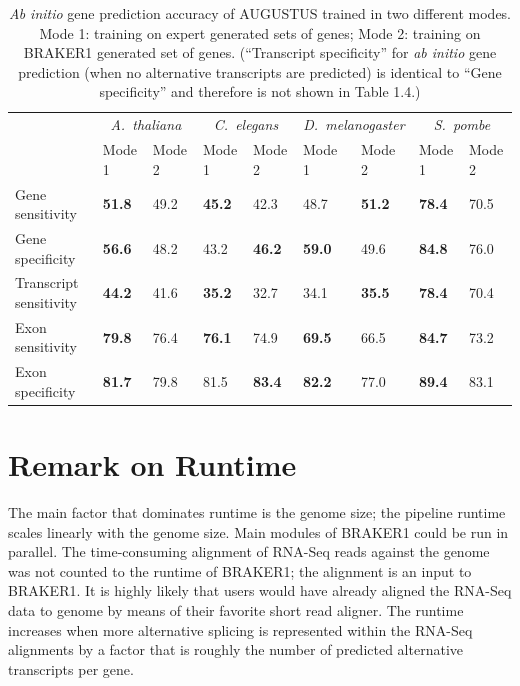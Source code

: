 \documentclass[a4paper,10pt]{report}
\begin{document}
\begin{table}[h!]
\begin{center}
\begin{tabular}{lp{1.5cm}p{1.2cm}p{1.2cm}p{1.2cm}p{1.2cm}p{1.2cm}p{1.2cm}p{1.2cm}}\hline
 & \multicolumn{2}{c}{\textit{A.~thaliana}} &  \multicolumn{2}{c}{\textit{C.~elegans}} &  \multicolumn{2}{c}{\textit{D.~melanogaster}} &  \multicolumn{2}{c}{\textit{S.~pombe}}\\
 & \tiny{Mode 1} & \tiny{Mode 2} & \tiny{Mode 1} & \tiny{Mode 2} &  \tiny{Mode 1} & \tiny{Mode 2} & \tiny{Mode 1} &\tiny{Mode 2}\\
 \hline
Gene sensitivity        & \textbf{51.8} & 49.2 & \textbf{45.2} & 42.3 & 48.7 & \textbf{51.2} & \textbf{78.4} & 70.5 \\
Gene specificity        & \textbf{56.6} & 48.2 & 43.2 & \textbf{46.2} & \textbf{59.0} & 49.6 & \textbf{84.8} & 76.0  \\
Transcript sensitivity  & \textbf{44.2} & 41.6 & \textbf{35.2} & 32.7 & 34.1 & \textbf{35.5} & \textbf{78.4} & 70.4  \\
Exon sensitivity        & \textbf{79.8} & 76.4 & \textbf{76.1} & 74.9 & \textbf{69.5} & 66.5 & \textbf{84.7} & 73.2  \\
Exon specificity        & \textbf{81.7} & 79.8 & 81.5 & \textbf{83.4} & \textbf{82.2} & 77.0 & \textbf{89.4} & 83.1  \\
\hline
\end{tabular}
\end{center}
\caption{\textit{Ab initio} gene prediction accuracy of AUGUSTUS trained in two different modes. Mode 1: training on expert generated sets of genes; Mode 2: training on BRAKER1 generated set of genes. (``Transcript specificity'' for \textit{ab initio} gene prediction (when no alternative transcripts are predicted) is identical to ``Gene specificity'' and therefore is not shown in Table 1.4.) \label{single_preds_braker}}
\end{table}

\section{Remark on Runtime}

The main factor that dominates runtime is the genome size; the pipeline runtime scales linearly with the genome size. Main modules of BRAKER1 could be run in parallel. The time-consuming alignment of RNA-Seq reads against the genome was not counted to the runtime of BRAKER1; the alignment is an input to BRAKER1. 
It is highly likely that users would have already aligned the RNA-Seq data to genome by means of their favorite short read aligner. 
The runtime increases when more alternative splicing is represented within the RNA-Seq alignments by a factor that is roughly the number of predicted alternative transcripts per gene.
\end{document}
